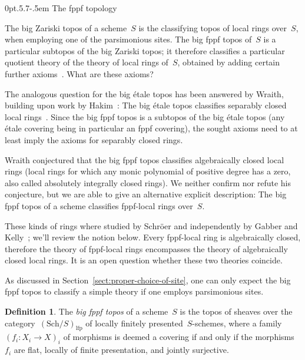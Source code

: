 \documentclass[10pt,reqno,a4paper]{amsbook}
\makeatletter
\theoremstyle{definition}
\newtheorem{defn}{Definition}[section]
\theoremstyle{plain}
\theoremstyle{remark}
\newcommand{\Sch}{\mathrm{Sch}}
\newcommand{\lfp}{\mathrm{lfp}}
\newcommand{\?}{\,{:}\,}
\renewcommand{\_}{\mathpunct{.}\,}
\def\subsection{\@startsection{subsection}{2}%
  {0pt}{.5\linespacing\@plus.7\linespacing}{-.5em}%
  {\normalfont\bfseries}}
\makeatother
\begin{document}


\subsection{The fppf topology}

The big Zariski topos of a scheme~$S$ is the classifying topos of local rings
over~$S$, when employing one of the parsimonious sites. The big fppf topos
of~$S$ is a particular subtopos of the big Zariski topos; it therefore
classifies a particular quotient theory of the theory of local rings of~$S$,
obtained by adding certain further axioms~\cite{caramello:lattices}. What are
these axioms?

The analogous question for the big étale topos has been answered by Wraith,
building upon work by Hakim~\cite{hakim:relative-schemes}: The big étale topos
classifies separably closed local rings~\cite{wraith:generic-galois-theory}.
Since the big fppf topos is a subtopos of the big étale topos (any étale
covering being in particular an fppf covering), the sought axioms need to at
least imply the axioms for separably closed rings.

Wraith conjectured that the big fppf topos classifies algebraically closed
local rings (local rings for which any monic polynomial of positive degree has
a zero, also called absolutely integrally closed rings). We neither confirm nor
refute his conjecture, but we are able to give an alternative explicit
description: The big fppf topos of a scheme classifies fppf-local rings
over~$S$.

These kinds of rings where studied by Schröer and independently by Gabber and
Kelly~\cite{schroer:points-fppf,gabber:kelly:points}; we'll review the notion
below. Every fppf-local ring is algebraically closed, therefore the theory of
fppf-local rings encompasses the theory of algebraically closed local rings. It
is an open question whether these two theories coincide.

As discussed in Section~\ref{sect:proper-choice-of-site}, one can only expect
the big fppf topos to classify a simple theory if one employs parsimonious
sites.

\begin{defn}The \emph{big fppf topos} of a scheme~$S$ is the topos of sheaves
over the category~$(\Sch/S)_\lfp$ of locally finitely presented~$S$-schemes, where a
family~$(f_i : X_i \to X)_i$ of morphisms is deemed a covering if and only if
the morphisms~$f_i$ are flat, locally of finite presentation, and jointly surjective.\end{defn}
\end{document}
